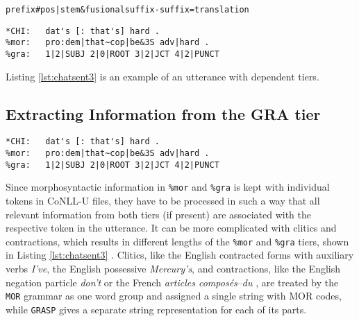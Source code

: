 
\texttt{prefix\#pos|stem\&fusionalsuffix-suffix=translation}

\lstset{
numbers = none,
frame = single,
}

\begin{lstlisting}[caption={Excerpt from Adam/040217.cha of the Brown Corpus (\cite{brown1973})}, label={lst:chatsent3}]
*CHI:   dat's [: that's] hard .
%mor:   pro:dem|that~cop|be&3S adv|hard .
%gra:   1|2|SUBJ 2|0|ROOT 3|2|JCT 4|2|PUNCT
\end{lstlisting}

Listing \ref{lst:chatsent3} is an example of an utterance with dependent tiers.\\

\subsection{Extracting Information from the GRA tier}

\lstset{
numbers = none,
frame = single,
}

\begin{lstlisting}[caption={Example to show the different number of strings in \texttt{\%mor} and \texttt{\&gra} tiers due to contracted form \emph{that's}.}, label={lst:chatsent3}]
*CHI:   dat's [: that's] hard .
%mor:   pro:dem|that~cop|be&3S adv|hard .
%gra:   1|2|SUBJ 2|0|ROOT 3|2|JCT 4|2|PUNCT
\end{lstlisting}


Since morphosyntactic information in \texttt{\%mor} and \texttt{\%gra} is kept with individual tokens in CoNLL-U files, they have to be processed in such a way that all relevant information from both tiers (if present) are associated with the respective token in the utterance. It can be more complicated with clitics and contractions, which results in different lengths of the \texttt{\%mor} and \texttt{\%gra} tiers, shown in Listing \ref{lst:chatsent3} . Clitics, like the English contracted forms with auxiliary verbs \emph{I've}, the English possessive \emph{Mercury's}, and contractions, like the English negation particle \emph{don't} or the French \emph{articles composés}--\emph{du} , are treated by the \texttt{MOR} grammar as one word group and assigned a single string with MOR codes, while \texttt{GRASP} gives a separate string representation for each of its parts.

